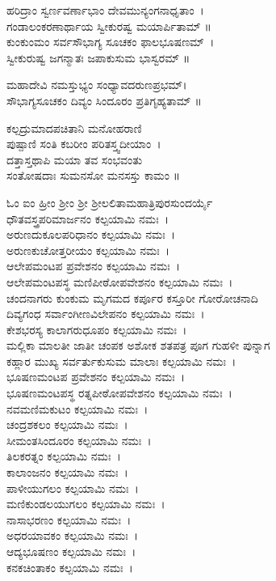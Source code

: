 ಹರಿದ್ರಾಂ ಸ್ವರ್ಣವರ್ಣಾಭಾಂ ದೇವಮುನ್ಯಂಗನಾಧೃತಾಂ~।\\ಗಂಡಾಲಂಕರಣಾರ್ಥಾಯ ಸ್ವೀಕುರಷ್ವ ಮಯಾರ್ಪಿತಾಮ್ ॥\\
\newpage ಕುಂಕುಂಮಂ ಸರ್ವಸೌಭಾಗ್ಯ ಸೂಚಕಂ ಫಾಲಭೂಷಣಮ್~।\\ ಸ್ವೀಕುರುಷ್ವ ಜಗನ್ಮಾತಃ ಜಪಾಕುಸುಮ ಭಾಸ್ವರಮ್ ॥

ಮಹಾದೇವಿ ನಮಸ್ತುಭ್ಯಂ ಸಂಧ್ಯಾವದರುಣಪ್ರಭಮ್।\\ಸೌಭಾಗ್ಯಸೂಚಕಂ ದಿವ್ಯಂ ಸಿಂದೂರಂ ಪ್ರತಿಗೃಹ್ಯತಾಮ್ ॥

ಕಲ್ಪದ್ರುಮಾದಪಚಿತಾನಿ ಮನೋಹರಾಣಿ \\ಪುಷ್ಪಾಣಿ ಸಂತಿ ಕಬರೀಂ ಪರಿತಸ್ತ್ವದೀಯಾಂ~।\\
ದತ್ತಾಸ್ತಥಾಪಿ ಮಯಾ ತವ ಸಂಭವಂತು \\ಸಂತೋಷದಾಃ ಸುಮನಸೋ ಮನಸಸ್ತು ಕಾಮಂ ॥

ಓಂ ಐಂ ಹ್ರೀಂ ಶ್ರೀಂ ಶ್ರೀ ಶ್ರೀಲಲಿತಾಮಹಾತ್ರಿಪುರಸುಂದರ್ಯೈ \\ಧೌತವಸ್ತ್ರಪರಿಮಾರ್ಜನಂ ಕಲ್ಪಯಾಮಿ ನಮಃ~।\\
ಅರುಣದುಕೂಲಪರಿಧಾನಂ ಕಲ್ಪಯಾಮಿ ನಮಃ~।\\
ಅರುಣಕುಚೋತ್ತರೀಯಂ ಕಲ್ಪಯಾಮಿ ನಮಃ~।\\
ಆಲೇಪಮಂಟಪ ಪ್ರವೇಶನಂ ಕಲ್ಪಯಾಮಿ ನಮಃ~।\\
ಆಲೇಪಮಂಟಪಸ್ಥ ಮಣಿಪೀಠೋಪವೇಶನಂ ಕಲ್ಪಯಾಮಿ ನಮಃ~।\\
ಚಂದನಾಗರು ಕುಂಕುಮ ಮೃಗಮದ ಕರ್ಪೂರ ಕಸ್ತೂರೀ ಗೋರೋಚನಾದಿ\\ ದಿವ್ಯಗಂಧ ಸರ್ವಾಂಗೀಣವಿಲೇಪನಂ ಕಲ್ಪಯಾಮಿ ನಮಃ~।\\
ಕೇಶಭರಸ್ಯ ಕಾಲಾಗರುಧೂಪಂ ಕಲ್ಪಯಾಮಿ ನಮಃ~।\\
ಮಲ್ಲಿಕಾ ಮಾಲತೀ ಜಾತೀ ಚಂಪಕ ಅಶೋಕ ಶತಪತ್ರ ಪೂಗ ಗುಹಳೀ ಪುನ್ನಾಗ \\ಕಹ್ಲಾರ ಮುಖ್ಯ ಸರ್ವರ್ತುಕುಸುಮ ಮಾಲಾಃ ಕಲ್ಪಯಾಮಿ ನಮಃ~।\\
ಭೂಷಣಮಂಟಪ ಪ್ರವೇಶನಂ ಕಲ್ಪಯಾಮಿ ನಮಃ~।\\
ಭೂಷಣಮಂಟಪಸ್ಥ ರತ್ನಪೀಠೋಪವೇಶನಂ ಕಲ್ಪಯಾಮಿ ನಮಃ~।\\
ನವಮಣಿಮಕುಟಂ ಕಲ್ಪಯಾಮಿ ನಮಃ~।\\
ಚಂದ್ರಶಕಲಂ ಕಲ್ಪಯಾಮಿ ನಮಃ~।\\
ಸೀಮಂತಸಿಂದೂರಂ ಕಲ್ಪಯಾಮಿ ನಮಃ~।\\
ತಿಲಕರತ್ನಂ ಕಲ್ಪಯಾಮಿ ನಮಃ~।\\
ಕಾಲಾಂಜನಂ ಕಲ್ಪಯಾಮಿ ನಮಃ~।\\
ಪಾಳೀಯುಗಲಂ ಕಲ್ಪಯಾಮಿ ನಮಃ~।\\
ಮಣಿಕುಂಡಲಯುಗಲಂ ಕಲ್ಪಯಾಮಿ ನಮಃ~।\\
ನಾಸಾಭರಣಂ ಕಲ್ಪಯಾಮಿ ನಮಃ~।\\
ಅಧರಯಾವಕಂ ಕಲ್ಪಯಾಮಿ ನಮಃ~।\\
ಆದ್ಯಭೂಷಣಂ ಕಲ್ಪಯಾಮಿ ನಮಃ~।\\
ಕನಕಚಿಂತಾಕಂ ಕಲ್ಪಯಾಮಿ ನಮಃ~।\\
